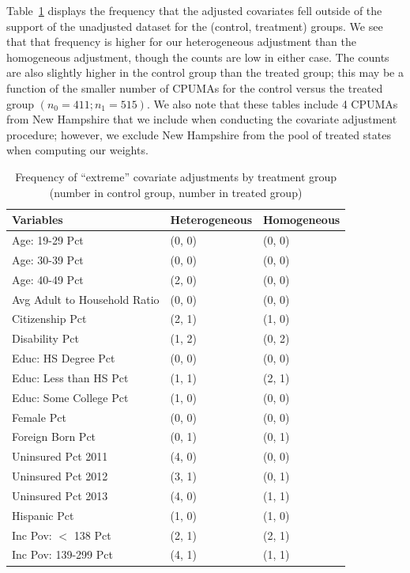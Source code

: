 Table~\ref{tab:extreme1} displays the frequency that the adjusted covariates fell outside of the support of the unadjusted dataset for the (control, treatment) groups. We see that that frequency is higher for our heterogeneous adjustment than the homogeneous adjustment, though the counts are low in either case. The counts are also slightly higher in the control group than the treated group; this may be a function of the smaller number of CPUMAs for the control versus the treated group $(n_0 = 411; n_1 = 515)$. We also note that these tables include 4 CPUMAs from New Hampshire that we include when conducting the covariate adjustment procedure; however, we exclude New Hampshire from the pool of treated states when computing our weights.

\begin{table}[h!]
\centering
    \caption{Frequency of ``extreme'' covariate adjustments by treatment group \\ (number in control group, number in treated group)}
    \label{tab:extreme1}
\begin{tabular}{lll}
  \hline
Variables & Heterogeneous & Homogeneous \\ 
  \hline
Age: 19-29 Pct & (0, 0) & (0, 0) \\ 
  Age: 30-39 Pct & (0, 0) & (0, 0) \\ 
  Age: 40-49 Pct & (2, 0) & (0, 0) \\ 
  Avg Adult to Household Ratio & (0, 0) & (0, 0) \\ 
  Citizenship Pct & (2, 1) & (1, 0) \\ 
  Disability Pct & (1, 2) & (0, 2) \\ 
  Educ: HS Degree Pct & (0, 0) & (0, 0) \\ 
  Educ: Less than HS Pct & (1, 1) & (2, 1) \\ 
  Educ: Some College Pct & (1, 0) & (0, 0) \\ 
  Female Pct & (0, 0) & (0, 0) \\ 
  Foreign Born Pct & (0, 1) & (0, 1) \\ 
  Uninsured Pct 2011 & (4, 0) & (0, 0) \\ 
  Uninsured Pct 2012 & (3, 1) & (0, 1) \\ 
  Uninsured Pct 2013 & (4, 0) & (1, 1) \\ 
  Hispanic Pct & (1, 0) & (1, 0) \\ 
  Inc Pov: $<$ 138 Pct & (2, 1) & (2, 1) \\ 
  Inc Pov: 139-299 Pct & (4, 1) & (1, 1) \\ 

\end{tabular}
\end{table}
